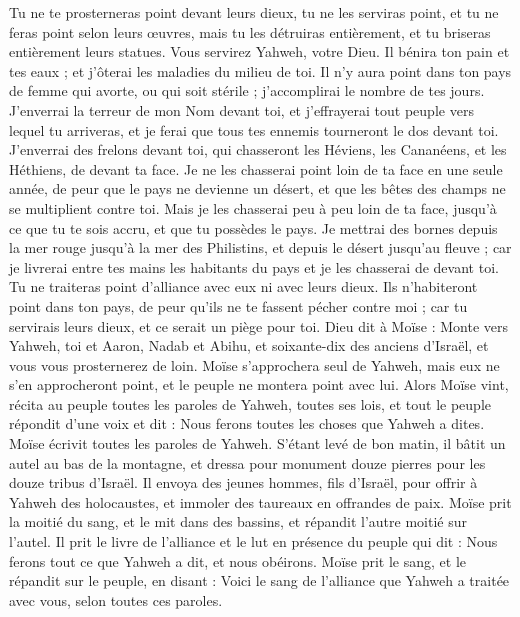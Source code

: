 \begin{multicols}{2}
Tu ne te prosterneras point devant leurs dieux, tu ne les serviras point, et tu ne feras point selon leurs œuvres, mais tu les détruiras entièrement, et tu briseras entièrement leurs statues\FTNT{}.
Vous servirez Yahweh, votre Dieu. Il bénira ton pain et tes eaux ; et j'ôterai les maladies du milieu de toi\FTNT{}.
Il n'y aura point dans ton pays de femme qui avorte, ou qui soit stérile ; j'accomplirai le nombre de tes jours.
J'enverrai la terreur de mon Nom devant toi, et j'effrayerai tout peuple vers lequel tu arriveras, et je ferai que tous tes ennemis tourneront le dos devant toi\FTNT{}.
J'enverrai des frelons devant toi, qui chasseront les Héviens, les Cananéens, et les Héthiens, de devant ta face\FTNT{}.
Je ne les chasserai point loin de ta face en une seule année, de peur que le pays ne devienne un désert, et que les bêtes des champs ne se multiplient contre toi.
Mais je les chasserai peu à peu loin de ta face, jusqu'à ce que tu te sois accru, et que tu possèdes le pays.
Je mettrai des bornes depuis la mer rouge jusqu'à la mer des Philistins, et depuis le désert jusqu'au fleuve ; car je livrerai entre tes mains les habitants du pays et je les chasserai de devant toi.
Tu ne traiteras point d'alliance avec eux ni avec leurs dieux.
Ils n'habiteront point dans ton pays, de peur qu'ils ne te fassent pécher contre moi ; car tu servirais leurs dieux, et ce serait un piège pour toi.
\VerseOne{}Dieu dit à Moïse : Monte vers Yahweh, toi et Aaron, Nadab et Abihu, et soixante-dix des anciens d'Israël, et vous vous prosternerez de loin.
Moïse s'approchera seul de Yahweh, mais eux ne s'en approcheront point, et le peuple ne montera point avec lui.
Alors Moïse vint, récita au peuple toutes les paroles de Yahweh, toutes ses lois, et tout le peuple répondit d'une voix et dit : Nous ferons toutes les choses que Yahweh a dites.
Moïse écrivit toutes les paroles de Yahweh. S'étant levé de bon matin, il bâtit un autel au bas de la montagne, et dressa pour monument douze pierres pour les douze tribus d'Israël.
Il envoya des jeunes hommes, fils d'Israël, pour offrir à Yahweh des holocaustes, et immoler des taureaux en offrandes de paix.
Moïse prit la moitié du sang, et le mit dans des bassins, et répandit l'autre moitié sur l'autel.
Il prit le livre de l'alliance et le lut en présence du peuple qui dit : Nous ferons tout ce que Yahweh a dit, et nous obéirons.
Moïse prit le sang, et le répandit sur le peuple, en disant : Voici le sang de l'alliance que Yahweh a traitée avec vous, selon toutes ces paroles\FTNT{}.

\end{multicols}
